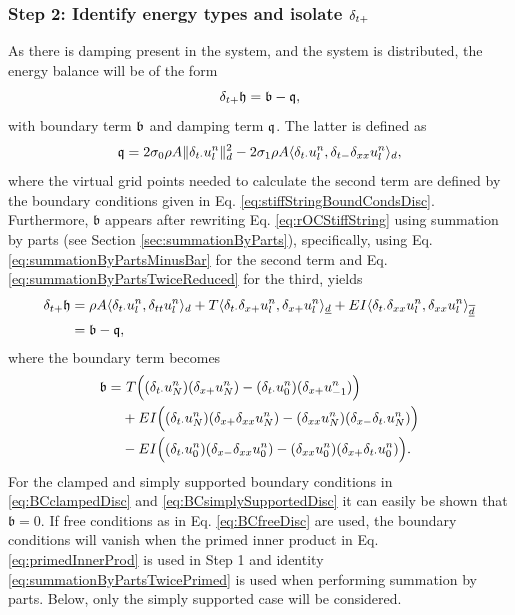 {\subsubsection{Step 2: Identify energy types and isolate $\delta_{t+}$}
As there is damping present in the system, and the system is distributed, the energy balance will be of the form 
\begin{equation}
    \delta_{t+} \mathfrak{h} = \mathfrak{b}-\mathfrak{q},
\end{equation}
with boundary term $\mathfrak{b}$ and damping term $\mathfrak{q}$. The latter is defined as
\begin{equation}\label{eq:dampingTermStiffString}
    \mathfrak{q} = 2\sigma_{0} \rho A \lVert\delta_{t\cdot}u_l^n\rVert_d^2 - 2 \sigma_{1} \rho A \langle \delta_{t\cdot} u_l^n, \delta_{t-} \delta_{xx} u_l^n \rangle_d,
\end{equation}
where the virtual grid points needed to calculate the second term are defined by the boundary conditions given in Eq. \eqref{eq:stiffStringBoundCondsDisc}. Furthermore, $\mathfrak{b}$ appears after rewriting Eq. \eqref{eq:rOCStiffString} using summation by parts (see Section \ref{sec:summationByParts}), specifically, using Eq. \eqref{eq:summationByPartsMinusBar} for the second term and Eq. \eqref{eq:summationByPartsTwiceReduced} for the third, yields
\begin{align*}
    \delta_{t+} \mathfrak{h} &= \rho A \langle \delta_{t\cdot} u_l^n, \delta_{tt} u_l^n \rangle_d + T \langle \delta_{t\cdot} \delta_{x+} u_l^n, \delta_{x+} u_l^n\rangle_{\underline{d}} + EI \langle \delta_{t\cdot} \delta_{xx} u_l^n, \delta_{xx} u_l^n \rangle_{\overline{\underline{d}}} \\
    &= \mathfrak{b} - \mathfrak{q},
\end{align*}
where the boundary term becomes
\begin{align*}
    \mathfrak{b} =&\ T\Big((\delta_{t\cdot} u_N^n)(\delta_{x+} u_N^n) - (\delta_{t\cdot} u_0^n) (\delta_{x+} u_{-1}^n)\Big) \\
    &+ EI \Big((\delta_{t\cdot} u_N^n)(\delta_{x+} \delta_{xx} u_N^n) - (\delta_{xx} u_N^n)(\delta_{x-} \delta_{t\cdot} u_N^n) \Big)\\
    &- EI \Big((\delta_{t\cdot} u_0^n)(\delta_{x-} \delta_{xx} u_0^n) - (\delta_{xx} u_0^n)(\delta_{x+} \delta_{t\cdot} u_0^n)\Big).
\end{align*}
For the clamped and simply supported boundary conditions in \eqref{eq:BCclampedDisc} and \eqref{eq:BCsimplySupportedDisc} it can easily be shown that $\mathfrak{b} = 0$. If free conditions as in Eq. \eqref{eq:BCfreeDisc} are used, the boundary conditions will vanish when the primed inner product in Eq. \eqref{eq:primedInnerProd} is used in Step 1 and identity \eqref{eq:summationByPartsTwicePrimed} is used when performing summation by parts. Below, only the simply supported case will be considered. 

}

